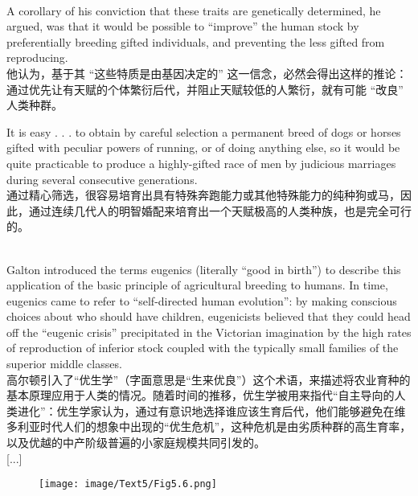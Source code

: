\documentclass{article}
\begin{document}
\addtolength{\leftskip}{-1cm}

\\
A corollary of his conviction that these traits are genetically determined, he argued, was that it would be possible to “improve” the human stock by preferentially breeding gifted individuals, and preventing the less gifted from reproducing.\\
他认为，基于其 “这些特质是由基因决定的” 这一信念，必然会得出这样的推论：通过优先让有天赋的个体繁衍后代，并阻止天赋较低的人繁衍，就有可能 “改良” 人类种群。\\

\addtolength{\leftskip}{1cm}

\noindent It is easy . . . to obtain by careful selection a permanent breed of dogs or horses gifted with peculiar powers of running, or of doing anything else, so it would be quite practicable to produce a highly-gifted race of men by judicious marriages during several consecutive generations.\\
通过精心筛选，很容易培育出具有特殊奔跑能力或其他特殊能力的纯种狗或马，因此，通过连续几代人的明智婚配来培育出一个天赋极高的人类种族，也是完全可行的。 \\

\addtolength{\leftskip}{-1cm}


\\
Galton introduced the terms eugenics (literally “good in birth”) to describe this application of the basic principle of agricultural breeding to humans. In time, eugenics came to refer to “self-directed human evolution”: by making conscious choices about who should have children, eugenicists believed that they could head off the “eugenic crisis” precipitated in the Victorian imagination by the high rates of reproduction of inferior stock coupled with the typically small families of the superior middle classes.\\
高尔顿引入了“优生学”（字面意思是“生来优良”）这个术语，来描述将农业育种的基本原理应用于人类的情况。随着时间的推移，优生学被用来指代“自主导向的人类进化”：优生学家认为，通过有意识地选择谁应该生育后代，他们能够避免在维多利亚时代人们的想象中出现的“优生危机”，这种危机是由劣质种群的高生育率，以及优越的中产阶级普遍的小家庭规模共同引发的。 \\

[...]

\begin{figure}
    \centering
    \texttt{[image: image/Text5/Fig5.6.png]}
\end{figure}
\end{document}
